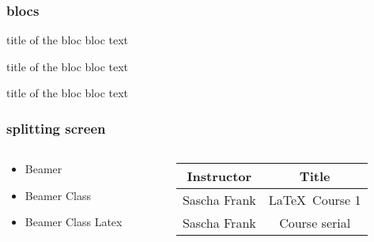 \begin{frame}
\titlepage
\end{frame}


\begin{frame}\frametitle{blocs}

\begin{block}{title of the bloc}
bloc text
\end{block}

\begin{exampleblock}{title of the bloc}
bloc text
\end{exampleblock}


\begin{alertblock}{title of the bloc}
bloc text
\end{alertblock}
\end{frame}

\begin{frame}\frametitle{splitting screen}
\begin{columns}
\begin{column}{5cm}


\begin{itemize}
\item Beamer
\item Beamer Class
\item Beamer Class Latex
\end{itemize}

\end{column}
\begin{column}{5cm}

\begin{tabular}{|c|c|}
\hline
\textbf{Instructor} & \textbf{Title} \\
\hline
Sascha Frank &  \LaTeX \ Course 1 \\
\hline
Sascha Frank &  Course serial  \\
\hline
\end{tabular}

\end{column}
\end{columns}

\end{frame}
